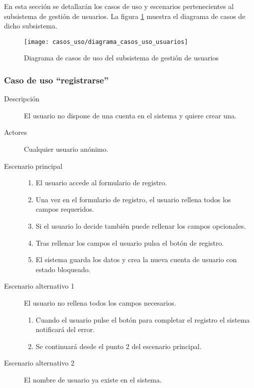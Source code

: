En esta sección se detallarán los casos de uso y escenarios pertenecientes al subsistema de gestión de usuarios.
La figura \ref{fig:casos_uso_subsistema_usuarios} muestra el diagrama de casos de dicho subsistema.

\begin{figure}[h]
\centering
\texttt{[image: casos\_uso/diagrama\_casos\_uso\_usuarios]}
\caption{Diagrama de casos de uso del subsistema de gestión de usuarios}
\label{fig:casos_uso_subsistema_usuarios}
\end{figure}


\subsubsection{Caso de uso ``registrarse''}
\begin{description}
\item[Descripción] 				El usuario no dispone de una cuenta en el sistema y quiere crear una.
\item[Actores]					Cualquier usuario anónimo.
\item[Escenario principal]	 	\hfill
								\begin{enumerate}
								\item El usuario accede al formulario de registro.
								\item Una vez en el formulario de registro, el usuario rellena todos los campos requeridos.
								\item Si el usuario lo decide también puede rellenar los campos opcionales.
								\item Tras rellenar los campos el usuario pulsa el botón de registro.
								\item El sistema guarda los datos y crea la nueva cuenta de usuario con estado bloqueado.
								\end{enumerate}
\item[Escenario alternativo 1]	El usuario no rellena todos los campos necesarios.
								\begin{enumerate}
								\item Cuando el usuario pulse el botón para completar el registro el sistema notificará del error.
								\item Se continuará desde el punto 2 del escenario principal.
								\end{enumerate}
\item[Escenario alternativo 2]	El nombre de usuario ya existe en el sistema.
								\begin{enumerate}

\end{enumerate}
\end{description}
